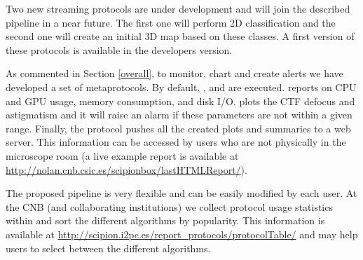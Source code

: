 Two new streaming protocols are under development and will join the described  pipeline in a near future. The first one will perform 2D classification and the second one will create an initial 3D map based on these classes. A first version of these protocols is available in the \scipion developers version.

As commented in Section \ref{overall}, to monitor, chart and create alerts  we have developed a set of metaprotocols. By default, ,  and  are executed.  reports on  CPU and GPU usage, memory consumption, and disk I/O.  plots the CTF defocus and astigmatism  and it will raise an alarm if these parameters are not within a given range. Finally, the  protocol pushes all the created plots and summaries to a web server. This information can be accessed by users who are not physically in the microscope room (a live example report is available at \url{http://nolan.cnb.csic.es/scipionbox/lastHTMLReport/}).

The proposed pipeline is very flexible and can be easily modified by each user. At the CNB (and collaborating institutions) we collect protocol usage statistics within \scipion and sort the different algorithms by popularity.  This information is available at  \url{http://scipion.i2pc.es/report_protocols/protocolTable/} and may help users to select between the different algorithms.


